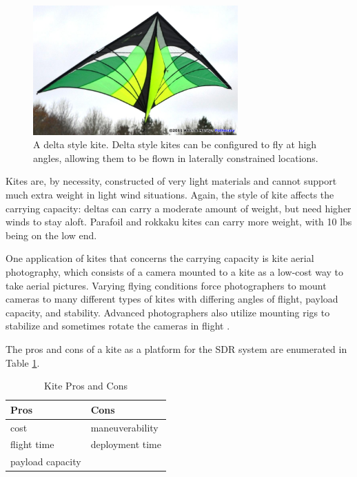 \begin{figure}[ht]
\centering
\includegraphics[width=0.70\textwidth]{img/delta-kite.jpg}
\caption{A delta style kite. Delta style kites can be configured to fly at high angles, allowing them to be flown in laterally constrained locations.}
\label{fig:delta_kite}
\end{figure}\par
Kites are, by necessity, constructed of very light materials and cannot support much extra weight in light wind situations. Again, the style of kite affects the carrying capacity: deltas can carry a moderate amount of weight, but need higher winds to stay aloft. Parafoil and rokkaku kites can carry more weight, with 10 lbs being on the low end.\par
One application of kites that concerns the carrying capacity is kite aerial photography, which consists of a camera mounted to a kite as a low-cost way to take aerial pictures. Varying flying conditions force photographers to mount cameras to many different types of kites with differing angles of flight, payload capacity, and stability. Advanced photographers also utilize mounting rigs to stabilize and sometimes rotate the cameras in flight \cite{kite_iqp}.\par
The pros and cons of a kite as a platform for the SDR system are enumerated in Table \ref{table:kite_pc}.
\begin{table}[ht]
\centering
\caption{Kite Pros and Cons}
\label{table:kite_pc}
\begin{tabular}{l|l}
  Pros & Cons \\ \hline
  cost & maneuverability \\
  flight time & deployment time \\
  payload capacity & \\
\end{tabular}
\end{table}\par


